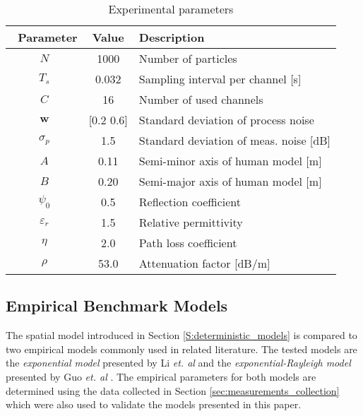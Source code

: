 \documentclass[journal, 10pt, twocolumn, balance]{IEEEtran}
\begin{document}
\begin{table}[!t]
    \caption{Experimental parameters} \centering \begin{tabular}{c c l} \hline\hline\ Parameter & Value & Description \\
        \hline  $N$ & 1000  &  Number of particles \\ $T_s$ & 0.032  &  Sampling interval per channel [s] \\ $C$ & 16  &  Number of used channels \\ $\bm{w}$ & [0.2 0.6] & Standard deviation of process noise \\ $\sigma_p$ & 1.5 & Standard deviation of meas. noise [dB] \\ $A$ & 0.11  & Semi-minor axis of human model [m] \\ $B$ & 0.20 & Semi-major axis of human model [m]  \\ $\psi_0$ & 0.5 & Reflection coefficient \\ $\varepsilon_r$ & 1.5 & Relative permittivity \\ $\eta$ & 2.0 & Path loss coefficient \\ $\rho$ & 53.0 & Attenuation factor [dB/m] \\ 
        \hline \end{tabular}
        \label{table:experimental_parameters} \end{table}



\subsection{Empirical Benchmark Models}

The spatial model introduced in Section \ref{S:deterministic_models} is compared to two empirical models commonly used in related literature. The tested models are the \emph{exponential model} presented by Li \emph{et. al} \cite{li2011} and the \emph{exponential-Rayleigh model} presented by Guo \emph{et. al} \cite{Guo2013}. The empirical parameters for both models are determined using the data collected in Section \ref{sec:measurements_collection} which were also used to validate the models presented in this paper. 
\end{document}
